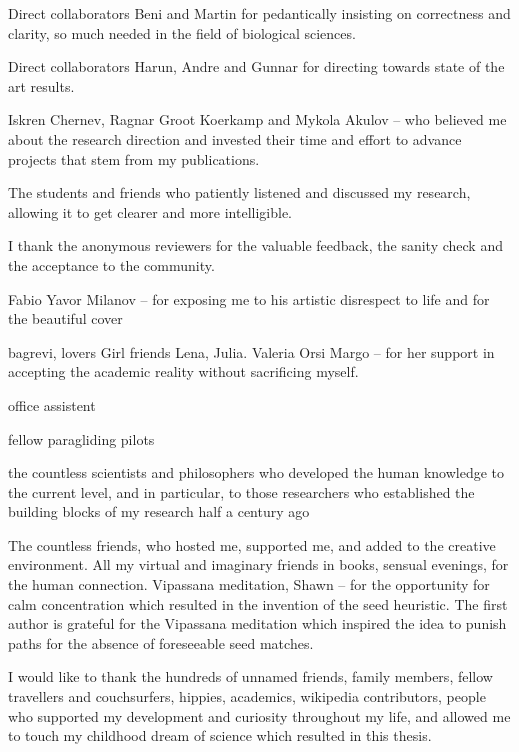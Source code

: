 Direct collaborators Beni and Martin for pedantically insisting on correctness
and clarity, so much needed in the field of biological sciences.

Direct collaborators Harun, Andre and Gunnar for directing towards state of the art results.

Iskren Chernev, Ragnar Groot Koerkamp and Mykola Akulov -- who believed me about
the research direction and invested their time and effort to advance projects
that stem from my publications.

The students and friends who patiently listened and discussed my research,
allowing it to get clearer and more intelligible.

I thank the anonymous reviewers for the valuable feedback, the sanity check and
the acceptance to the community. 


Fabio
Yavor Milanov -- for exposing me to his artistic disrespect to life and for the beautiful cover

bagrevi, lovers 
Girl friends Lena, Julia.
Valeria Orsi 
Margo -- for her support in accepting the academic reality without sacrificing myself.

office assistent

fellow paragliding pilots

the countless scientists and philosophers who developed the human knowledge to
the current level, and in particular, to those researchers who established the
building blocks of my research half a century ago


The countless friends, who hosted me, supported me, and added to the creative
environment. All my virtual and imaginary friends in books, sensual evenings,
for the human connection. Vipassana meditation, Shawn -- for the opportunity for
calm concentration which resulted in the invention of the seed heuristic. The
first author is grateful for the Vipassana meditation which inspired the idea to
punish paths for the absence of foreseeable seed matches.

I would like to thank the hundreds of unnamed friends, family members, fellow
travellers and couchsurfers, hippies, academics, wikipedia contributors, people
who supported my development and curiosity throughout my life, and allowed me to
touch my childhood dream of science which resulted in this thesis.

\endgroup
